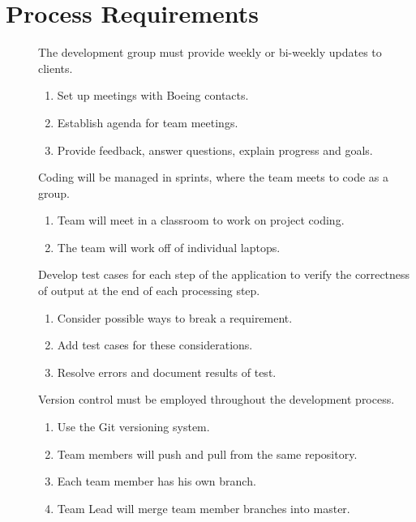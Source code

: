 \documentclass[pdftex,10pt,a4paper]{article}
\begin{document}
\section*{Process Requirements}
\begin{description}
\item[] The development group must provide weekly or bi-weekly updates to clients.
\begin{enumerate}
\item Set up meetings with Boeing contacts.
\item Establish agenda for team meetings.
\item Provide feedback, answer questions, explain progress and goals.
\end{enumerate}
\item[] Coding will be managed in sprints, where the team meets to code as a group.
\begin{enumerate}
\item Team will meet in a classroom to work on project coding.
\item The team will work off of individual laptops.
\end{enumerate}
\item[] Develop test cases for each step of the application to verify the correctness of output at the end of each processing step.
\begin{enumerate}
\item Consider possible ways to break a requirement.
\item Add test cases for these considerations.
\item Resolve errors and document results of test.
\end{enumerate}
\item[] Version control must be employed throughout the development process.
\begin{enumerate}
\item Use the Git versioning system.
\item Team members will push and pull from the same repository.
\item Each team member has his own branch.
\item Team Lead will merge team member branches into master.
\end{enumerate}
\end{description}
\end{document}
